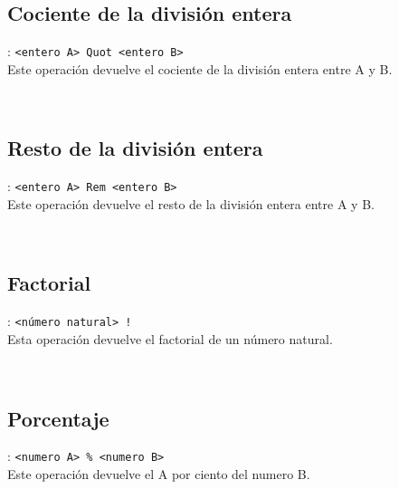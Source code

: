       \subsection*{Cociente de la división entera}: \texttt{<entero A>~Quot <entero B>}\\
      Este operación devuelve el cociente de la división entera entre A y B.
      
      \begin{fxcode}
         \\
      \end{fxcode}
      
      \subsection*{Resto de la división entera}: \texttt{<entero A>~Rem <entero B>}\\
      Este operación devuelve el resto de la división entera entre A y B.
      
      \begin{fxcode}
         \\
      \end{fxcode}
      
      \subsection*{Factorial}: \texttt{<número natural>~!}\\
      Esta operación devuelve el factorial de un número natural.
      
      \begin{fxcode}
         \\
      \end{fxcode}
      
      \subsection*{Porcentaje}: \texttt{<numero A>~\%~<numero B>}\\
      Este operación devuelve el A por ciento del numero B.
      
      \begin{fxcode}
         \\
      \end{fxcode}
      
